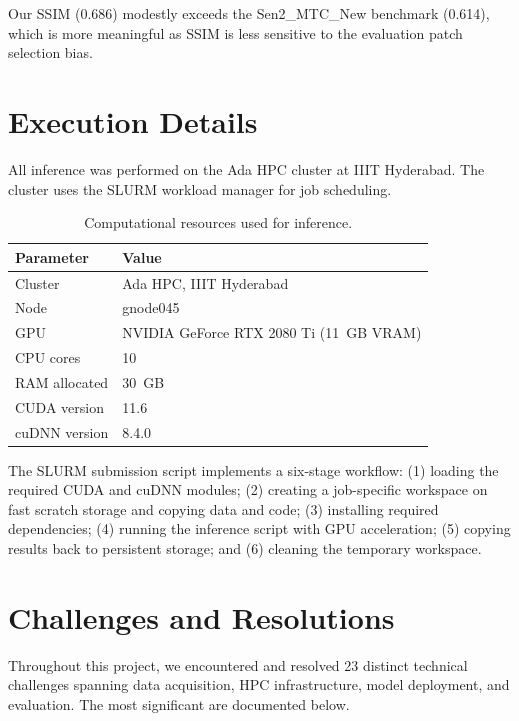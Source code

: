 \documentclass[12pt,a4paper]{article}
\begin{document}
Our SSIM (0.686) modestly exceeds the Sen2\_MTC\_New benchmark (0.614), which is more meaningful as SSIM is less sensitive to the evaluation patch selection bias.



\section{Execution Details}

All inference was performed on the Ada HPC cluster at IIIT Hyderabad. The cluster uses the SLURM workload manager for job scheduling.

\begin{table}[H]
\centering
\caption{Computational resources used for inference.}
\label{tab:compute}
\begin{tabular}{ll}
\toprule
\textbf{Parameter} & \textbf{Value} \\
\midrule
Cluster & Ada HPC, IIIT Hyderabad \\
Node & gnode045 \\
GPU & NVIDIA GeForce RTX 2080 Ti (11~GB VRAM) \\
CPU cores & 10 \\
RAM allocated & 30~GB \\
CUDA version & 11.6 \\
cuDNN version & 8.4.0 \\
\bottomrule
\end{tabular}
\end{table}

The SLURM submission script implements a six-stage workflow: (1) loading the required CUDA and cuDNN modules; (2) creating a job-specific workspace on fast scratch storage and copying data and code; (3) installing required dependencies; (4) running the inference script with GPU acceleration; (5) copying results back to persistent storage; and (6) cleaning the temporary workspace.



\section{Challenges and Resolutions}

Throughout this project, we encountered and resolved 23 distinct technical challenges spanning data acquisition, HPC infrastructure, model deployment, and evaluation. The most significant are documented below.
\end{document}
